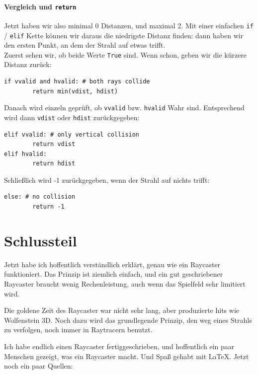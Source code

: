 \documentclass[a4paper,12pt]{report}
\newcommand{\mychapter}[2]{
    \setcounter{chapter}{#1}
    \setcounter{section}{0}
    \chapter*{#2}
    \addcontentsline{toc}{chapter}{#2}
}
\begin{document}
\subsubsection{Vergleich und \texttt{return}}
Jetzt haben wir also minimal 0 Distanzen, und maximal 2. Mit einer einfachen \texttt{if} / \texttt{elif} Kette können wir daraus die niedrigste Distanz finden: dann haben wir den ersten Punkt, an dem der Strahl auf etwas trifft. \\
Zuerst sehen wir, ob beide Werte \texttt{True} sind. Wenn schon, geben wir die kürzere Distanz zurück:
\begin{Verbatim}[baselinestretch=1.0, xleftmargin=1cm]
if vvalid and hvalid: # both rays collide
        return min(vdist, hdist)
\end{Verbatim}
Danach wird einzeln geprüft, ob \texttt{vvalid} bzw. \texttt{hvalid} Wahr sind. Entsprechend wird dann \texttt{vdist} oder \texttt{hdist} zurückgegeben:
\begin{Verbatim}[baselinestretch=1.0, xleftmargin=1cm]
elif vvalid: # only vertical collision
        return vdist
elif hvalid:
        return hdist
\end{Verbatim}
Schließlich wird -1 zurückgegeben, wenn der Strahl auf nichts trifft:
\begin{Verbatim}[baselinestretch=1.0, xleftmargin=1cm]
else: # no collision
        return -1
\end{Verbatim}

\begingroup
\renewcommand{\cleardoublepage}{}
\renewcommand{\clearpage}{}

\mychapter{3}{Schlussteil}
Jetzt habe ich hoffentlich verständlich erklärt, genau wie ein Raycaster funktioniert. Das Prinzip ist ziemlich einfach, und ein gut geschriebener Raycaster braucht wenig Rechenleistung, auch wenn das Spielfeld sehr limitiert wird.

Die goldene Zeit des Raycaster war nicht sehr lang, aber produzierte hits wie Wolfenstein 3D. Noch dazu wird das grundlegende Prinzip, den weg eines Strahls zu verfolgen, noch immer in Raytracern benutzt.

Ich habe endlich einen Raycaster fertiggeschrieben, und hoffentlich ein paar Menschen gezeigt, was ein Raycaster macht. Und Spaß gehabt mit \LaTeX. Jetzt noch ein paar Quellen:
\endgroup
\end{document}
